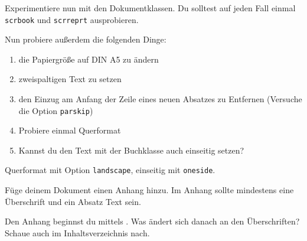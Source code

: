 \begin{uebung}
\item Experimentiere nun mit den Dokumentklassen. Du solltest auf jeden
    Fall einmal \texttt{scrbook} und \texttt{scrreprt} ausprobieren.
    
    Nun probiere außerdem die folgenden Dinge:
    \begin{enumerate}
        \item die Papiergröße auf DIN A5 zu ändern
        \item zweispaltigen Text zu setzen
        \item den Einzug am Anfang der Zeile eines neuen Absatzes zu
            Entfernen (Versuche die Option \texttt{parskip})
        \item Probiere einmal Querformat
        \item Kannst du den Text mit der Buchklasse auch einseitig setzen?
    \end{enumerate}
    \begin{loesung}
        Querformat mit Option \texttt{landscape}, einseitig mit \texttt{oneside}.
    \end{loesung}

\item Füge deinem Dokument einen Anhang hinzu. Im Anhang sollte mindestens
    eine Überschrift und ein Absatz Text sein.
    \begin{hinweis}
        Den Anhang beginnst du mittels . Was ändert sich
        danach an den Überschriften? Schaue auch im Inhaltsverzeichnis nach.
    \end{hinweis}\label{markup:last}

\end{uebung}